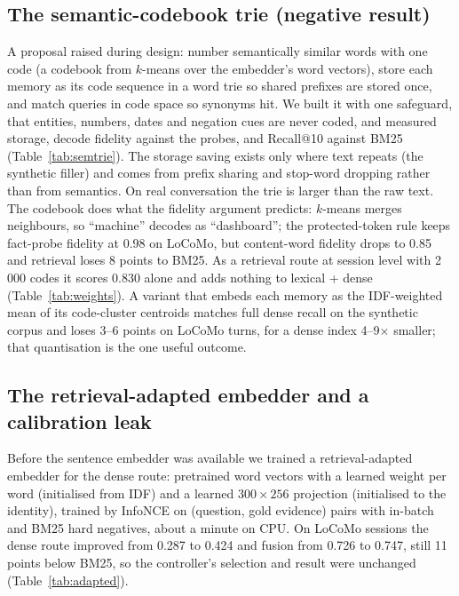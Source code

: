 \documentclass[journal]{IEEEtran}
\begin{document}
\subsection{The semantic-codebook trie (negative result)}
\label{sec:semtrie}
A proposal raised during design: number semantically similar words with one code (a codebook from $k$-means over the embedder's word vectors), store each memory as its code sequence in a word trie so shared prefixes are stored once, and match queries in code space so synonyms hit. We built it with one safeguard, that entities, numbers, dates and negation cues are never coded, and measured storage, decode fidelity against the probes, and Recall@10 against BM25 (Table~\ref{tab:semtrie}). The storage saving exists only where text repeats (the synthetic filler) and comes from prefix sharing and stop-word dropping rather than from semantics. On real conversation the trie is larger than the raw text. The codebook does what the fidelity argument predicts: $k$-means merges neighbours, so ``machine'' decodes as ``dashboard''; the protected-token rule keeps fact-probe fidelity at 0.98 on LoCoMo, but content-word fidelity drops to 0.85 and retrieval loses 8 points to BM25. As a retrieval route at session level with 2\,000 codes it scores 0.830 alone and adds nothing to lexical + dense (Table~\ref{tab:weights}). A variant that embeds each memory as the IDF-weighted mean of its code-cluster centroids matches full dense recall on the synthetic corpus and loses 3--6 points on LoCoMo turns, for a dense index 4--9$\times$ smaller; that quantisation is the one useful outcome.

\begin{table}[t]
\caption{Semantic-codebook trie as storage}
\label{tab:semtrie}
\centering
\scriptsize
{}
\end{table}

\subsection{The retrieval-adapted embedder and a calibration leak}
\label{sec:adapted}
Before the sentence embedder was available we trained a retrieval-adapted embedder for the dense route: pretrained word vectors with a learned weight per word (initialised from IDF) and a learned $300 \times 256$ projection (initialised to the identity), trained by InfoNCE on (question, gold evidence) pairs with in-batch and BM25 hard negatives, about a minute on CPU. On LoCoMo sessions the dense route improved from 0.287 to 0.424 and fusion from 0.726 to 0.747, still 11 points below BM25, so the controller's selection and result were unchanged (Table~\ref{tab:adapted}).
\end{document}
